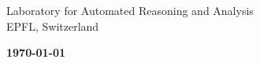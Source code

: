 \begin{titlepage}
\sf

    \begin{center}
        \vspace*{1cm}
 
        \textbf{\Huge \ourtitle}

        \vspace{1.5cm}
        
        {\Large \ournames}
             
        \vspace{1.5cm}
 
        {\Large Laboratory for Automated Reasoning and Analysis \\[1ex] EPFL, Switzerland}

    \end{center}

   \vfill

   \begin{center}
   \Large
     \textbf{\large \today}
   \end{center}

             
 \end{titlepage}
